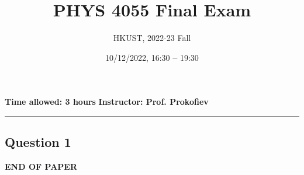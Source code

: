 \documentclass[a4paper, 12pt]{article}
\title{\textbf{PHYS 4055 Final Exam}}
\author{HKUST, 2022-23 Fall}
\date{10/12/2022, 16:30 \textbf{--} 19:30}
\begin{document}
\maketitle

\begin{center}
\textbf{Time allowed: 3 hours}
\hfill
\textbf{Instructor: Prof. Prokofiev} 
\rule{16.5cm}{1pt}
\end{center}

\subsection*{Question 1}
\vfill
\centerline{\bf END OF PAPER}
\end{document}
